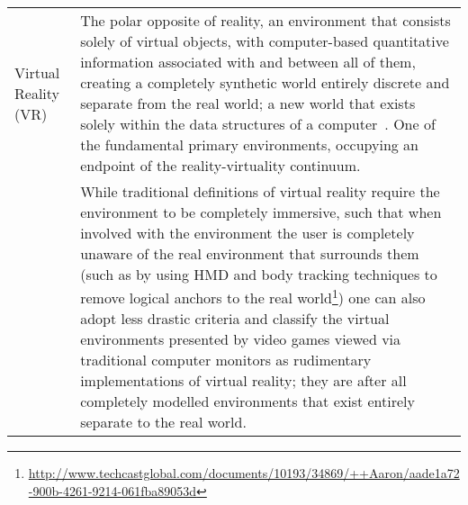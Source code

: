 \begin{center}
\begin{longtable}{ l p{10cm} }




Virtual Reality (VR) & The polar opposite of reality, an environment that consists solely of virtual objects, with computer-based quantitative information associated with and between all of them, creating a completely synthetic world entirely discrete and separate from the real world; a new world that exists solely within the data structures of a computer~\cite{Milgram1999, Want2009}. One of the fundamental primary environments, occupying an endpoint of the reality-virtuality continuum. \\

 & While traditional definitions of virtual reality require the environment to be completely immersive, such that when involved with the environment the user is completely unaware of the real environment that surrounds them (such as by using HMD and body tracking techniques to remove logical anchors to the real world\footnote{\url{http://www.techcastglobal.com/documents/10193/34869/++Aaron/aade1a72-900b-4261-9214-061fba89053d}}) one can also adopt less drastic criteria and classify the virtual environments presented by video games viewed via traditional computer monitors as rudimentary implementations of virtual reality; they are after all completely modelled environments that exist entirely separate to the real world. \\
		
\midrule



		


\end{longtable}
\end{center}
